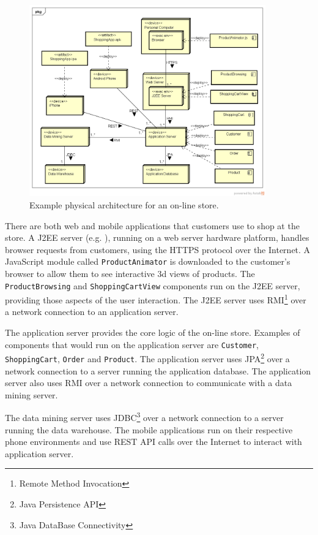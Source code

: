 \begin{figure}[h!]
    \centering
    \includegraphics[trim=38 42 24 45,clip,width=0.91\textwidth]{images/uml/deployment_diagram.png}
    \caption{Example physical architecture for an on-line store.}
    \label{fig:deploymentDiagram}
\end{figure}

\noindent
There are both web and mobile applications that customers use to shop at the store.
A J2EE server (e.g. ), running on a web server hardware platform,
handles browser requests from customers, using the HTTPS protocol over the Internet.
A JavaScript module called \texttt{ProductAnimator} is downloaded to the customer's browser to allow them to see interactive 3d views of products.
The \texttt{ProductBrowsing} and \texttt{ShoppingCartView} components run on the J2EE server, providing those aspects of the user interaction.
The J2EE server uses RMI\footnote{Remote Method Invocation} over a network connection to an application server.

The application server provides the core logic of the on-line store.
Examples of components that would run on the application server are \texttt{Customer}, \texttt{ShoppingCart}, \texttt{Order} and \texttt{Product}.
The application server uses JPA\footnote{Java Persistence API} over a network connection to a server running the application database.
The application server also uses RMI over a network connection to communicate with a data mining server.

The data mining server uses JDBC\footnote{Java DataBase Connectivity} over a network connection to a server running the data warehouse.
The mobile applications run on their respective phone environments and use REST API calls over the Internet to interact with application server.

